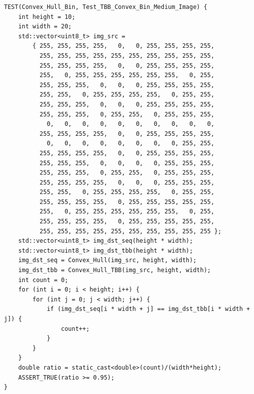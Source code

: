\documentclass{report}
\begin{document}
\begin{lstlisting}
TEST(Convex_Hull_Bin, Test_TBB_Convex_Bin_Medium_Image) {
    int height = 10;
    int width = 20;
    std::vector<uint8_t> img_src =
        { 255, 255, 255, 255,   0,   0, 255, 255, 255, 255,
          255, 255, 255, 255, 255, 255, 255, 255, 255, 255,
          255, 255, 255, 255,   0,   0, 255, 255, 255, 255,
          255,   0, 255, 255, 255, 255, 255, 255,   0, 255,
          255, 255, 255,   0,   0,   0, 255, 255, 255, 255,
          255, 255,   0, 255, 255, 255, 255,   0, 255, 255,
          255, 255, 255,   0,   0,   0, 255, 255, 255, 255,
          255, 255, 255,   0, 255, 255,   0, 255, 255, 255,
            0,   0,   0,   0,   0,   0,   0,   0,   0,   0,
          255, 255, 255, 255,   0,   0, 255, 255, 255, 255,
            0,   0,   0,   0,   0,   0,   0,   0, 255, 255,
          255, 255, 255, 255,   0,   0, 255, 255, 255, 255,
          255, 255, 255,   0,   0,   0,   0, 255, 255, 255,
          255, 255, 255,   0, 255, 255,   0, 255, 255, 255,
          255, 255, 255, 255,   0,   0,   0, 255, 255, 255,
          255, 255,   0, 255, 255, 255, 255,   0, 255, 255,
          255, 255, 255, 255,   0, 255, 255, 255, 255, 255,
          255,   0, 255, 255, 255, 255, 255, 255,   0, 255,
          255, 255, 255, 255,   0, 255, 255, 255, 255, 255,
          255, 255, 255, 255, 255, 255, 255, 255, 255, 255 };
    std::vector<uint8_t> img_dst_seq(height * width);
    std::vector<uint8_t> img_dst_tbb(height * width);
    img_dst_seq = Convex_Hull(img_src, height, width);
    img_dst_tbb = Convex_Hull_TBB(img_src, height, width);
    int count = 0;
    for (int i = 0; i < height; i++) {
        for (int j = 0; j < width; j++) {
            if (img_dst_seq[i * width + j] == img_dst_tbb[i * width + j]) {
                count++;
            }
        }
    }
    double ratio = static_cast<double>(count)/(width*height);
    ASSERT_TRUE(ratio >= 0.95);
}


\end{lstlisting}
\end{document}
